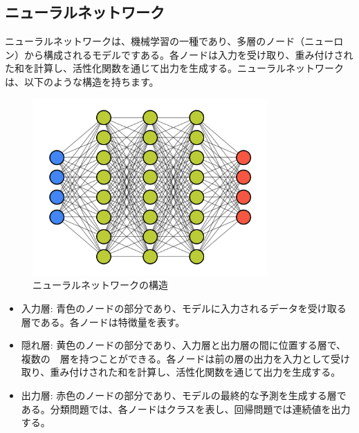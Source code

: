 
\subsection{ニューラルネットワーク}
ニューラルネットワークは、機械学習の一種であり、多層のノード（ニューロン）から構成されるモデルですある。各ノードは入力を受け取り、重み付けされた和を計算し、活性化関数を通じて出力を生成する。ニューラルネットワークは、以下のような構造を持ちます。

\begin{figure}[H]
    \centering
    \includegraphics[width=0.8\textwidth]{images/struc_NN.png}
    \caption{ニューラルネットワークの構造}
    \label{fig:adversarial_learning1}
\end{figure}

\begin{itemize}
    \item 入力層: 青色のノードの部分であり、モデルに入力されるデータを受け取る層である。各ノードは特徴量を表す。
    \item 隠れ層: 黄色のノードの部分であり、入力層と出力層の間に位置する層で、複数の　層を持つことができる。各ノードは前の層の出力を入力として受け取り、重み付けされた和を計算し、活性化関数を通じて出力を生成する。
    \item 出力層: 赤色のノードの部分であり、モデルの最終的な予測を生成する層である。分類問題では、各ノードはクラスを表し、回帰問題では連続値を出力する。
\end{itemize}

